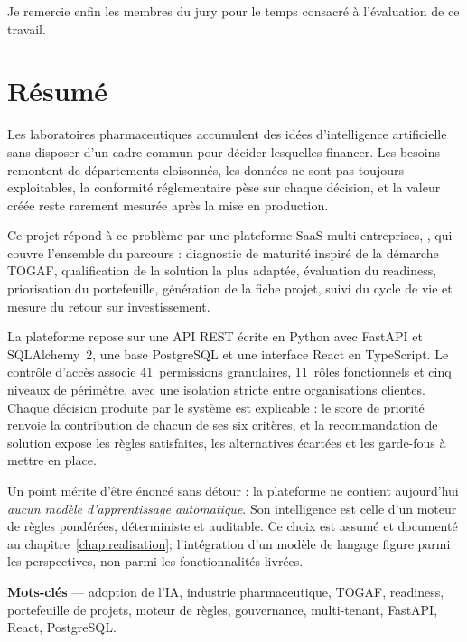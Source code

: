 Je remercie enfin les membres du jury pour le temps consacré à l'évaluation de ce
travail.

\chapter*{Résumé}

Les laboratoires pharmaceutiques accumulent des idées d'intelligence artificielle sans
disposer d'un cadre commun pour décider lesquelles financer. Les besoins remontent de
départements cloisonnés, les données ne sont pas toujours exploitables, la conformité
réglementaire pèse sur chaque décision, et la valeur créée reste rarement mesurée après
la mise en production.

Ce projet répond à ce problème par une plateforme SaaS multi-entreprises,
\appname, qui couvre l'ensemble du parcours : diagnostic de maturité inspiré de
la démarche TOGAF, qualification de la solution la plus adaptée, évaluation du
readiness, priorisation du portefeuille, génération de la fiche projet, suivi du cycle
de vie et mesure du retour sur investissement.

La plateforme repose sur une API REST écrite en Python avec FastAPI et SQLAlchemy~2,
une base PostgreSQL et une interface React en TypeScript. Le contrôle d'accès associe
41~permissions granulaires, 11~rôles fonctionnels et cinq niveaux de périmètre, avec
une isolation stricte entre organisations clientes. Chaque décision produite par le
système est explicable : le score de priorité renvoie la contribution de chacun de ses
six critères, et la recommandation de solution expose les règles satisfaites, les
alternatives écartées et les garde-fous à mettre en place.

Un point mérite d'être énoncé sans détour : la plateforme ne contient aujourd'hui
\emph{aucun modèle d'apprentissage automatique}. Son intelligence est celle d'un moteur
de règles pondérées, déterministe et auditable. Ce choix est assumé et documenté au
chapitre~\ref{chap:realisation}; l'intégration d'un modèle de langage figure parmi les
perspectives, non parmi les fonctionnalités livrées.

\vspace{0.8em}
\noindent\textbf{Mots-clés} — adoption de l'IA, industrie pharmaceutique, TOGAF,
readiness, portefeuille de projets, moteur de règles, gouvernance, multi-tenant,
FastAPI, React, PostgreSQL.

